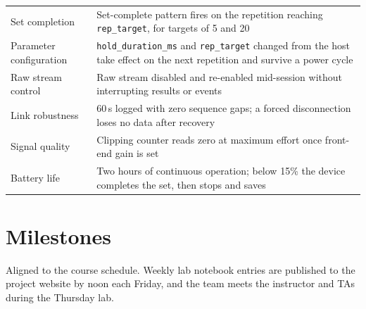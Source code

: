 \documentclass[11pt]{article}
\begin{document}
\begin{table}[H]
\begin{tabularx}{\linewidth}{@{}p{32mm} X@{}}
Set completion & Set-complete pattern fires on the repetition reaching \texttt{rep\_target}, for targets of 5 and 20 \\
Parameter configuration & \texttt{hold\_duration\_ms} and \texttt{rep\_target} changed from the host take effect on the next repetition and survive a power cycle \\
Raw stream control & Raw stream disabled and re-enabled mid-session without interrupting results or events \\
Link robustness & 60\,s logged with zero sequence gaps; a forced disconnection loses no data after recovery \\
Signal quality & Clipping counter reads zero at maximum effort once front-end gain is set \\
Battery life & Two hours of continuous operation; below 15\% the device completes the set, then stops and saves \\
\bottomrule
\end{tabularx}
\end{table}

\section{Milestones}

Aligned to the course schedule. Weekly lab notebook entries are published to the
project website by noon each Friday, and the team meets the instructor and TAs
during the Thursday lab.
\end{document}
